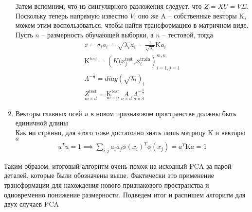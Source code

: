 \documentclass[12pt,fleqn]{article}
\begin{document}
\begin{enumerate}
Затем вспомним, что из сингулярного разложения следует, что $Z = XU = V\Sigma$. Поскольку теперь напрямую известно $V$, оно же $\text{A}$ -- собственные векторы $\text{K}$, можем этим воспользоваться, чтобы найти трансформацию в матричном виде. Пусть $n$ -- размерность обучающей выборки, а $n$ -- тестовой, тогда
\begin{equation}
  \begin{array}{l} 
    z = \sigma_i a_i = \sqrt{\lambda_i}a_i = \frac{1}{\sqrt{\lambda_i}}\text{K} a_i\\
    \text{K}^{\text{test}} = \left(K(x_j^{\text{test}}, x_i^{\text{train}} \right)_{i=1, j=1}^{m, n} \\
    \Lambda^{-\frac{1}{2}} = diag(\sqrt{\lambda_i})_i \\
    \underset{m \times d}{Z^{\text{test}}} = \underset{m \times n}{\text{K}^{\text{test}}} \ \underset{n \times d}{A} \ \underset{d\times d}{\Lambda^{-\frac{1}{2}}}
  \end{array}
\end{equation}


\item Векторы главных осей $u$ в новом признаковом пространстве должны быть единичной длины  \\ Как ни странно, для этого тоже достаточно знать лишь матрицу $\text{K}$ и векторы $a$
\begin{equation}
  \begin{array}{l}
  u^Tu = 1 \implies \sum_{i, j} a_i a_j \phi(x_i)^T \phi(x_j) = a^T\text{K}a = 1
  \end{array}
\end{equation}
\end{enumerate}

Таким образом, итоговый алгоритм очень похож на исходный PCA за парой деталей, которые были обозначены выше. Фактически это применение трансформации для нахождения нового признакового пространства и одновременно понижение размерности. Подведем итог и распишем алгоритм для двух случаев PCA
\end{document}
